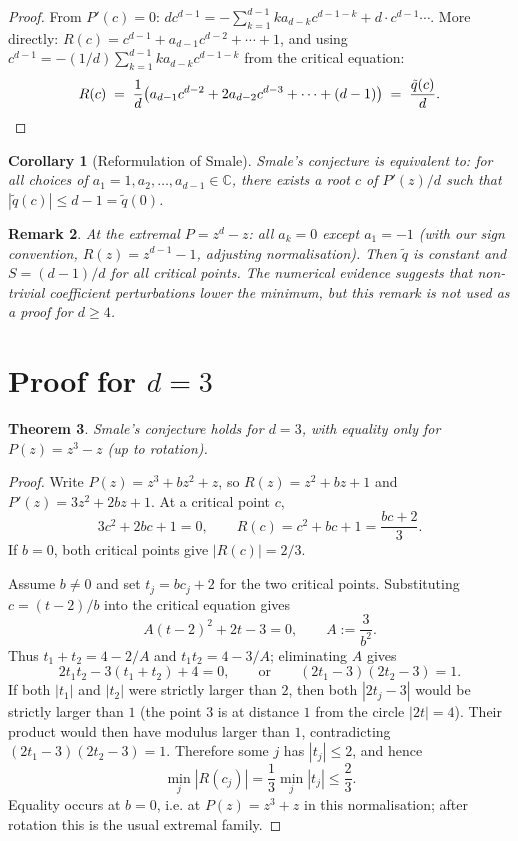 \documentclass[11pt,a4paper]{article}
\newtheorem{theorem}{Theorem}[section]
\newtheorem{corollary}[theorem]{Corollary}
\newtheorem{remark}[theorem]{Remark}
\begin{document}
\begin{proof}
From $P'(c) = 0$: $d c^{d-1} = -\sum_{k=1}^{d-1} k a_{d-k} c^{d-1-k} + d \cdot c^{d-1} \cdots$. More directly: $R(c) = c^{d-1} + a_{d-1} c^{d-2} + \cdots + 1$, and using $c^{d-1} = -(1/d) \sum_{k=1}^{d-1} k a_{d-k} c^{d-1-k}$ from the critical equation:
\begin{equation*}
R(c) \;=\; \frac{1}{d}\bigl(a_{d-1} c^{d-2} + 2 a_{d-2} c^{d-3} + \cdots + (d-1)\bigr) \;=\; \frac{\tilde q(c)}{d}. \qedhere
\end{equation*}
\end{proof}

\begin{corollary}[Reformulation of Smale]
Smale's conjecture is equivalent to: for all choices of $a_1 = 1, a_2, \dots, a_{d-1} \in \mathbb{C}$, there exists a root $c$ of $P'(z)/d$ such that $|\tilde q(c)| \le d - 1 = \tilde q(0)$.
\end{corollary}

\begin{remark}
At the extremal $P = z^d - z$: all $a_k = 0$ except $a_1 = -1$ (with our sign convention, $R(z) = z^{d-1} - 1$, adjusting normalisation). Then $\tilde q$ is constant and $S=(d-1)/d$ for all critical points. The numerical evidence suggests that non-trivial coefficient perturbations lower the minimum, but this remark is not used as a proof for $d \ge 4$.
\end{remark}

\section{Proof for $d = 3$}

\begin{theorem}
Smale's conjecture holds for $d = 3$, with equality only for $P(z) = z^3 - z$ (up to rotation).
\end{theorem}

\begin{proof}
Write $P(z)=z^3+bz^2+z$, so $R(z)=z^2+bz+1$ and
$P'(z)=3z^2+2bz+1$. At a critical point $c$,
\[
3c^2+2bc+1=0,
\qquad
R(c)=c^2+bc+1=\frac{bc+2}{3}.
\]
If $b=0$, both critical points give $|R(c)|=2/3$.

Assume $b\ne0$ and set $t_j=bc_j+2$ for the two critical points. Substituting
$c=(t-2)/b$ into the critical equation gives
\[
A(t-2)^2+2t-3=0,\qquad A:=\frac{3}{b^2}.
\]
Thus $t_1+t_2=4-2/A$ and $t_1t_2=4-3/A$; eliminating $A$ gives
\[
2t_1t_2-3(t_1+t_2)+4=0,
\qquad\text{or}\qquad
(2t_1-3)(2t_2-3)=1.
\]
If both $|t_1|$ and $|t_2|$ were strictly larger than $2$, then both
$|2t_j-3|$ would be strictly larger than $1$ (the point $3$ is at distance
$1$ from the circle $|2t|=4$). Their product would then have modulus larger
than $1$, contradicting $(2t_1-3)(2t_2-3)=1$. Therefore some $j$ has
$|t_j|\le2$, and hence
\[
\min_j |R(c_j)|=\frac{1}{3}\min_j |t_j|\le\frac{2}{3}.
\]
Equality occurs at $b=0$, i.e. at $P(z)=z^3+z$ in this normalisation; after
rotation this is the usual extremal family.
\end{proof}
\end{document}
